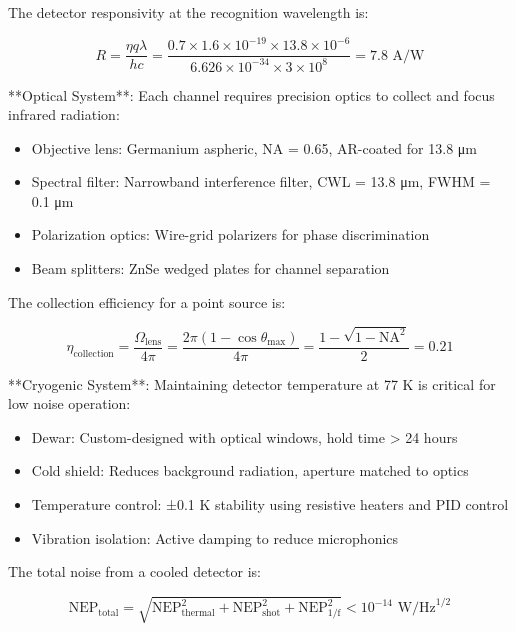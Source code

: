 \documentclass[12pt,a4paper]{report}
\begin{document}
The detector responsivity at the recognition wavelength is:

\begin{equation}
R = \frac{\eta q \lambda}{hc} = \frac{0.7 \times 1.6 \times 10^{-19} \times 13.8 \times 10^{-6}}{6.626 \times 10^{-34} \times 3 \times 10^8} = 7.8 \text{ A/W}
\end{equation}

**Optical System**: Each channel requires precision optics to collect and focus infrared radiation:

\begin{itemize}
\item Objective lens: Germanium aspheric, NA = 0.65, AR-coated for 13.8 μm
\item Spectral filter: Narrowband interference filter, CWL = 13.8 μm, FWHM = 0.1 μm
\item Polarization optics: Wire-grid polarizers for phase discrimination
\item Beam splitters: ZnSe wedged plates for channel separation
\end{itemize}

The collection efficiency for a point source is:

\begin{equation}
\eta_{\text{collection}} = \frac{\Omega_{\text{lens}}}{4\pi} = \frac{2\pi(1 - \cos\theta_{\text{max}})}{4\pi} = \frac{1 - \sqrt{1 - \text{NA}^2}}{2} = 0.21
\end{equation}

**Cryogenic System**: Maintaining detector temperature at 77 K is critical for low noise operation:

\begin{itemize}
\item Dewar: Custom-designed with optical windows, hold time > 24 hours
\item Cold shield: Reduces background radiation, aperture matched to optics
\item Temperature control: ±0.1 K stability using resistive heaters and PID control
\item Vibration isolation: Active damping to reduce microphonics
\end{itemize}

The total noise from a cooled detector is:

\begin{equation}
\text{NEP}_{\text{total}} = \sqrt{\text{NEP}_{\text{thermal}}^2 + \text{NEP}_{\text{shot}}^2 + \text{NEP}_{\text{1/f}}^2} < 10^{-14} \text{ W/Hz}^{1/2}
\end{equation}
\end{document}

